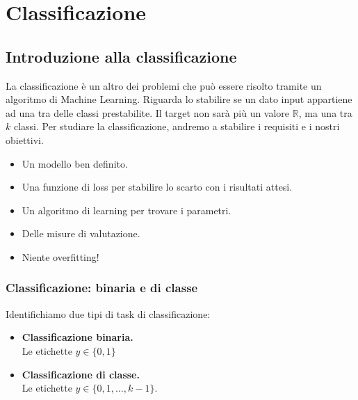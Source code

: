 \chapter{Classificazione}

\section{Introduzione alla classificazione}
La classificazione è un altro dei problemi che può essere risolto tramite un algoritmo di Machine Learning. Riguarda lo stabilire se un dato input appartiene ad una tra delle classi prestabilite. Il target non sarà più un valore $\mathbb{R}$, ma una tra $k$ classi.
Per studiare la classificazione, andremo a stabilire i requisiti e i nostri obiettivi.
\begin{itemize}
	\item Un modello ben definito.
	\item Una funzione di loss per stabilire lo scarto con i risultati attesi.
	\item Un algoritmo di learning per trovare i parametri.
	\item Delle misure di valutazione.
	\item Niente overfitting!
\end{itemize}

\subsection{Classificazione: binaria e di classe}
Identifichiamo due tipi di task di classificazione:
\begin{itemize}
	\item \textbf{Classificazione binaria.}\\
	Le etichette $y \in \{ 0,1\}$
	\item \textbf{Classificazione di classe.}\\
	Le etichette $y \in \{ 0,1, \dots, k-1\}$.
\end{itemize}
